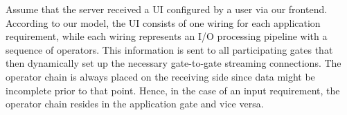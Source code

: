 \documentclass[twoside,twocolumn,10pt]{article}
\begin{document}


Assume that the server received a UI configured by a user via our frontend. According to our model, the UI consists of one wiring for each application requirement, while each wiring represents an I/O processing pipeline with a sequence of operators. This information is sent to all participating gates that then dynamically set up the necessary gate-to-gate streaming connections. The operator chain is always placed on the receiving side since data might be incomplete prior to that point. Hence, in the case of an input requirement, the operator chain resides in the application gate and vice versa.




\end{document}
